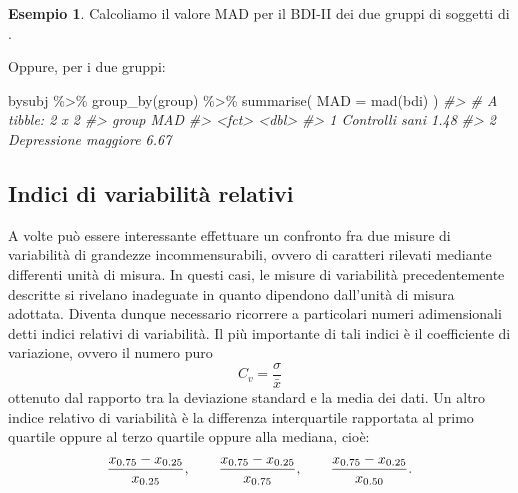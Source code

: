 \documentclass[
  10pt,
  italian,
  a4paper,
  extrafontsizes,onecolumn,openright
  ]{memoir}
\newenvironment{Shaded}{\begin{snugshade}}{\end{snugshade}}
\newcommand{\AttributeTok}[1]{\textcolor[rgb]{0.77,0.63,0.00}{#1}}
\newcommand{\CommentTok}[1]{\textcolor[rgb]{0.56,0.35,0.01}{\textit{#1}}}
\newcommand{\FloatTok}[1]{\textcolor[rgb]{0.00,0.00,0.81}{#1}}
\newcommand{\FunctionTok}[1]{\textcolor[rgb]{0.00,0.00,0.00}{#1}}
\newcommand{\NormalTok}[1]{#1}
\newcommand{\SpecialCharTok}[1]{\textcolor[rgb]{0.00,0.00,0.00}{#1}}
\theoremstyle{definition}
\theoremstyle{definition}
\newtheorem{example}{Esempio}[chapter]
\theoremstyle{definition}
\theoremstyle{definition}
\theoremstyle{remark}
\begin{document}
\begin{example}

Calcoliamo il valore MAD per il BDI-II dei due gruppi di soggetti di \textcite{zetschefuture2019}.

\begin{Shaded}
\end{Shaded}

Oppure, per i due gruppi:

\begin{Shaded}
\begin{Highlighting}[]
\NormalTok{bysubj }\SpecialCharTok{\%\textgreater{}\%} 
  \FunctionTok{group\_by}\NormalTok{(group) }\SpecialCharTok{\%\textgreater{}\%} 
  \FunctionTok{summarise}\NormalTok{(}
    \AttributeTok{MAD =} \FunctionTok{mad}\NormalTok{(bdi)}
\NormalTok{  ) }
\CommentTok{\#\textgreater{} \# A tibble: 2 x 2}
\CommentTok{\#\textgreater{}   group                  MAD}
\CommentTok{\#\textgreater{}   \textless{}fct\textgreater{}                \textless{}dbl\textgreater{}}
\CommentTok{\#\textgreater{} 1 Controlli sani        1.48}
\CommentTok{\#\textgreater{} 2 Depressione maggiore  6.67}
\end{Highlighting}
\end{Shaded}

\end{example}

\hypertarget{indici-di-variabilituxe0-relativi}{%
\subsection{Indici di variabilità relativi}\label{indici-di-variabilituxe0-relativi}}

A volte può essere interessante effettuare un confronto fra due misure
di variabilità di grandezze incommensurabili, ovvero di caratteri
rilevati mediante differenti unità di misura. In questi casi, le misure
di variabilità precedentemente descritte si rivelano inadeguate in
quanto dipendono dall'unità di misura adottata. Diventa dunque
necessario ricorrere a particolari numeri adimensionali detti indici
relativi di variabilità. Il più importante di tali indici è il
coefficiente di variazione, ovvero il numero puro
\[C_v = \frac{\sigma}{\bar{x}}\] ottenuto dal rapporto tra la deviazione
standard e la media dei dati. Un altro indice relativo di variabilità è
la differenza interquartile rapportata al primo quartile oppure al terzo
quartile oppure alla mediana, cioè:
\[\frac{x_{0.75} - x_{0.25}}{x_{0.25}}, \qquad \frac{x_{0.75} - x_{0.25}}{x_{0.75}}, \qquad \frac{x_{0.75} - x_{0.25}}{x_{0.50}}.\notag\]
\end{document}
